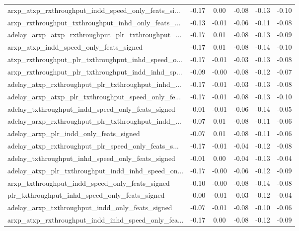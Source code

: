 \begin{tabular}{|l|*{4}{c}|r|}
arxp\_atxp\_rxthroughput\_indd\_speed\_only\_feats\_si... & -0.17 &  0.00 &   -0.08 &      -0.13 & -0.10 \\
arxp\_rxthroughput\_txthroughput\_inhd\_only\_feats\_... & -0.13 & -0.01 &   -0.06 &      -0.11 & -0.08 \\
adelay\_arxp\_atxp\_rxthroughput\_plr\_txthroughput\_... & -0.17 &  0.01 &   -0.08 &      -0.13 & -0.09 \\
arxp\_atxp\_indd\_speed\_only\_feats\_signed             & -0.17 &  0.01 &   -0.08 &      -0.14 & -0.10 \\
atxp\_rxthroughput\_plr\_txthroughput\_inhd\_speed\_o... & -0.17 & -0.01 &   -0.03 &      -0.13 & -0.08 \\
arxp\_rxthroughput\_plr\_txthroughput\_indd\_inhd\_sp... & -0.09 & -0.00 &   -0.08 &      -0.12 & -0.07 \\
adelay\_atxp\_rxthroughput\_plr\_txthroughput\_inhd\_... & -0.17 & -0.01 &   -0.03 &      -0.13 & -0.08 \\
adelay\_arxp\_atxp\_plr\_txthroughput\_speed\_only\_fe... & -0.17 & -0.01 &   -0.08 &      -0.13 & -0.10 \\
adelay\_txthroughput\_indd\_speed\_only\_feats\_signed   & -0.01 & -0.01 &   -0.06 &      -0.14 & -0.05 \\
adelay\_arxp\_rxthroughput\_plr\_txthroughput\_indd\_... & -0.07 &  0.01 &   -0.08 &      -0.11 & -0.06 \\
adelay\_arxp\_plr\_indd\_only\_feats\_signed             & -0.07 &  0.01 &   -0.08 &      -0.11 & -0.06 \\
adelay\_atxp\_rxthroughput\_plr\_speed\_only\_feats\_s... & -0.17 & -0.01 &   -0.04 &      -0.12 & -0.08 \\
adelay\_txthroughput\_inhd\_speed\_only\_feats\_signed   & -0.01 &  0.00 &   -0.04 &      -0.13 & -0.04 \\
adelay\_atxp\_plr\_txthroughput\_indd\_inhd\_speed\_on... & -0.17 & -0.00 &   -0.06 &      -0.12 & -0.09 \\
arxp\_txthroughput\_indd\_speed\_only\_feats\_signed     & -0.10 & -0.00 &   -0.08 &      -0.14 & -0.08 \\
plr\_txthroughput\_inhd\_speed\_only\_feats\_signed      & -0.00 & -0.01 &   -0.03 &      -0.12 & -0.04 \\
adelay\_arxp\_txthroughput\_indd\_only\_feats\_signed    & -0.07 & -0.01 &   -0.08 &      -0.10 & -0.06 \\
arxp\_atxp\_rxthroughput\_indd\_inhd\_speed\_only\_fea... & -0.17 &  0.00 &   -0.08 &      -0.12 & -0.09 \\

\end{tabular}
